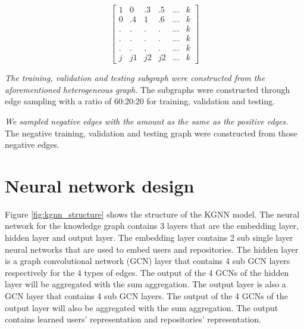 \documentclass[11pt,twoside]{report}
\begin{document}
\begin{equation}
    \begin{bmatrix}
        1 & 0 & .3 & .5 & ... & k \\
        0 & .4 & 1 & .6 & ... & k \\
        . & . & . & . & ... & k \\
        . & . & . & . & ... & k \\
        . & . & . & . & ... & k \\
        j & j1 & j2 & j2 & ... & k
        \label{matrix:repo_feature}
    \end{bmatrix}
\end{equation}

\textit{The training, validation and testing subgraph were constructed from the aforementioned heterogeneous graph.} The subgraphs were constructed through edge sampling with a ratio of 60:20:20 for training, validation and testing.

\textit{We sampled negative edges with the amount as the same as the positive edges.} The negative training, validation and testing graph were constructed from those negative edges.

\section{Neural network design}
Figure \ref{fig:kgnn_structure} shows the structure of the KGNN model. The neural network for the knowledge graph contains 3 layers that are the embedding layer, hidden layer and output layer. The embedding layer contains 2 sub single layer neural networks that are used to embed users and repositories. The hidden layer is a graph convolutional network (GCN) \cite{kipf_semi-supervised_2017} layer that contains 4 sub GCN layers respectively for the 4 types of edges. The output of the 4 GCNs of the hidden layer will be aggregated with the sum aggregation. The output layer is also a GCN layer that contains 4 sub GCN layers. The output of the 4 GCNs of the output layer will also be aggregated with the sum aggregation. The output contains learned users' representation and repositories' representation.
\end{document}
